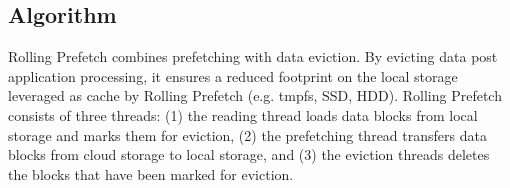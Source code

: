 \documentclass[conference]{IEEEtran}
\begin{document}
\subsection{Algorithm}



Rolling Prefetch combines prefetching with data eviction. By evicting data post application processing, it ensures a reduced footprint on the local storage leveraged as cache by Rolling Prefetch
(e.g. tmpfs, SSD, HDD). Rolling Prefetch consists of three threads: (1) the reading thread loads data blocks from local storage and marks them for eviction, (2) the prefetching thread transfers data blocks from cloud storage to local storage, and (3) the eviction threads deletes the blocks that have been marked for eviction.
    
    
    
        
        
\end{document}
